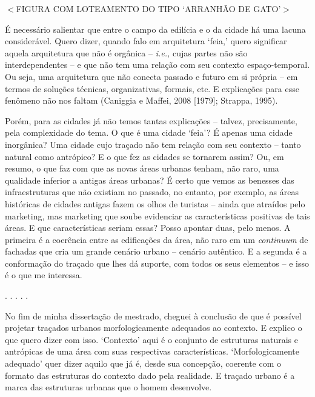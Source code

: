 \documentclass[12pt, a4paper]{book} %
\begin{document}
        $<$FIGURA COM LOTEAMENTO DO TIPO `ARRANHÃO DE GATO'$>$

        É necessário salientar que entre o campo da edilícia e o da cidade há uma lacuna considerável. Quero dizer, quando falo em arquitetura `feia,' quero significar aquela arquitetura que não é orgânica – \textit{i.e.,} cujas partes não são interdependentes – e que não tem uma relação com seu contexto espaço-temporal. Ou seja, uma arquitetura que não conecta passado e futuro em si própria – em termos de soluções técnicas, organizativas, formais, etc. E explicações para esse fenômeno não nos faltam (Caniggia e Maffei, 2008 [1979]; Strappa, 1995).

        Porém, para as cidades já não temos tantas explicações – talvez, precisamente, pela complexidade do tema. O que é uma cidade `feia'? É apenas uma cidade inorgânica? Uma cidade cujo traçado não tem relação com seu contexto – tanto natural como antrópico? E o que fez as cidades se tornarem assim? Ou, em resumo, o que faz com que as novas áreas urbanas tenham, não raro, uma qualidade inferior a antigas áreas urbanas? É certo que vemos as benesses das infraestruturas que não existiam no passado, no entanto, por exemplo, as áreas históricas de cidades antigas fazem os olhos de turistas – ainda que atraídos pelo marketing, mas marketing que soube evidenciar as características positivas de tais áreas. E que características seriam essas? Posso apontar duas, pelo menos. A primeira é a coerência entre as edificações da área, não raro em um \textit{continuum} de fachadas que cria um grande cenário urbano – cenário autêntico. E a segunda é a conformação do traçado que lhes dá suporte, com todos os seus elementos – e isso é o que me interessa.

        \begin{center}
        . . . . .
        \end{center}

        No fim de minha dissertação de mestrado, cheguei à conclusão de que é possível projetar traçados urbanos morfologicamente adequados ao contexto. E explico o que quero dizer com isso. `Contexto' aqui é o conjunto de estruturas naturais e antrópicas de uma área com suas respectivas características. `Morfologicamente adequado' quer dizer aquilo que já é, desde sua concepção, coerente com o formato das estruturas do contexto dado pela realidade. E traçado urbano é a marca das estruturas urbanas que o homem desenvolve.
\end{document}
